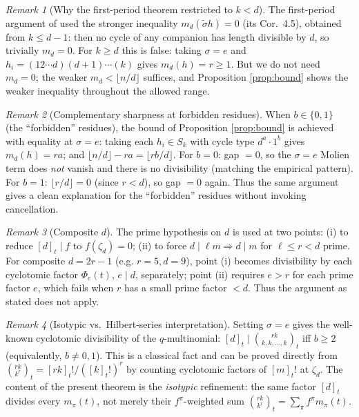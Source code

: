 \documentclass[11pt]{article}
\theoremstyle{plain}
\theoremstyle{definition}
\theoremstyle{remark}
\newtheorem*{remark}{Remark}
\begin{document}
\begin{remark}[Why the first-period theorem restricted to $k < d$]
The first-period argument of \cite{Clio-first-period} used the stronger
inequality $m_d(\tilde\sigma h) = 0$ (its Cor.\ 4.5), obtained from
$k \le d - 1$: then no cycle of any companion has length divisible by
$d$, so trivially $m_d = 0$. For $k \ge d$ this is false: taking
$\sigma = e$ and $h_i = (12\cdots d)(d+1)\cdots(k)$ gives
$m_d(h) = r \ge 1$. But we do not need $m_d = 0$; the weaker
$m_d < \lfloor n/d\rfloor$ suffices, and Proposition \ref{prop:bound}
shows the weaker inequality throughout the allowed range.
\end{remark}

\begin{remark}[Complementary sharpness at forbidden residues]
When $b \in \{0, 1\}$ (the ``forbidden'' residues), the bound of
Proposition \ref{prop:bound} is achieved with equality at
$\sigma = e$: taking each $h_i \in S_k$ with cycle type
$d^a \cdot 1^b$ gives $m_d(h) = ra$; and
$\lfloor n/d\rfloor - ra = \lfloor rb/d\rfloor$. For $b = 0$: gap $= 0$,
so the $\sigma = e$ Molien term does \emph{not} vanish and there is no
divisibility (matching the empirical pattern). For $b = 1$: $\lfloor r/d\rfloor
= 0$ (since $r < d$), so gap $= 0$ again. Thus the same argument gives
a clean explanation for the ``forbidden'' residues without invoking
cancellation.
\end{remark}

\begin{remark}[Composite $d$]
The prime hypothesis on $d$ is used at two points: (i) to reduce
$[d]_t \mid f$ to $f(\zeta_d) = 0$; (ii) to force $d \mid \ell m
\Rightarrow d \mid m$ for $\ell \le r < d$ prime.
For composite $d = 2r - 1$ (e.g. $r = 5, d = 9$), point (i) becomes
divisibility by each cyclotomic factor $\Phi_e(t)$, $e \mid d$, separately;
point (ii) requires $e > r$ for each prime factor $e$, which fails when
$r$ has a small prime factor $< d$. Thus the argument as stated does
not apply.
\end{remark}

\begin{remark}[Isotypic vs.\ Hilbert-series interpretation]
Setting $\sigma = e$ gives the well-known cyclotomic divisibility
of the $q$-multinomial:
$[d]_t \mid \binom{rk}{k, k, \ldots, k}_t$ iff $b \ge 2$
(equivalently, $b \ne 0, 1$). This is a classical fact and can be
proved directly from
$\binom{rk}{k^r}_t = [rk]_t!/([k]_t!)^r$ by counting cyclotomic factors
of $[m]_t!$ at $\zeta_d$. The content of the present theorem is the
\emph{isotypic} refinement: the same factor $[d]_t$ divides every
$m_\pi(t)$, not merely their $f^\pi$-weighted sum
$\binom{rk}{k^r}_t = \sum_\pi f^\pi m_\pi(t)$.
\end{remark}
\end{document}
